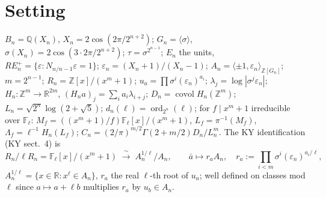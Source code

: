 \chapter{Setting}
\begin{definition}\label{def:setting}
$B_n=\mathbb{Q}(X_n)$, $X_n=2\cos(2\pi/2^{n+2})$; $G_n=\langle\sigma\rangle$, $\sigma(X_n)=2\cos(3\cdot 2\pi/2^{n+2})$;
$\tau=\sigma^{2^{n-1}}$; $E_n$ the units, $RE^+_n=\{\varepsilon: N_{n/n-1}\varepsilon=1\}$;
$\varepsilon_n=(X_n+1)/(X_n-1)$; $A_n=\langle\pm1,\varepsilon_n\rangle_{\mathbb{Z}[G_n]}$;
$m=2^{n-1}$; $R_n=\mathbb{Z}[x]/(x^m+1)$; $u_a=\prod\sigma^i(\varepsilon_n)^{a_i}$; $\lambda_j=\log|\sigma^j\varepsilon_n|$;
$H_n:\mathbb{Z}^m\to\mathbb{R}^{2m}$, $(H_na)_j=\sum_i a_i\lambda_{i+j}$; $D_n=\operatorname{covol}H_n(\mathbb{Z}^m)$;
$L_n=\sqrt{2^n}\log(2+\sqrt5)$; $d_n(\ell)=\operatorname{ord}_{2^n}(\ell)$; for $f\mid x^m+1$ irreducible over $\mathbb{F}_\ell$:
$M_f=((x^m+1)/f)\mathbb{F}_\ell[x]/(x^m+1)$, $L_f=\pi^{-1}(M_f)$, $\Lambda_f=\ell^{-1}H_n(L_f)$;
$C_n=(2/\pi)^{m/2}\Gamma(2+m/2)D_n/L_n^m$. The KY identification (KY sect.~4) is
\begin{equation}\label{eq:ident}
R_n/\ell R_n=\mathbb{F}_\ell[x]/(x^m+1)\;\xrightarrow{\ \sim\ }\;A_n^{1/\ell}/A_n,\qquad \bar a\mapsto r_aA_n,\quad r_a:=\prod_{i<m}\sigma^i(\varepsilon_n)^{a_i/\ell},
\end{equation}
$A_n^{1/\ell}=\{x\in\mathbb{R}:x^\ell\in A_n\}$, $r_a$ the real $\ell$-th root of $u_a$; well defined on classes mod $\ell$ since $a\mapsto a+\ell b$ multiplies $r_a$ by $u_b\in A_n$.
\end{definition}

